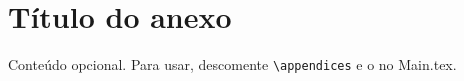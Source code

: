 \section{Título do anexo}
Conteúdo opcional. Para usar, descomente \verb|\appendices| e o \verb|| no Main.tex.
